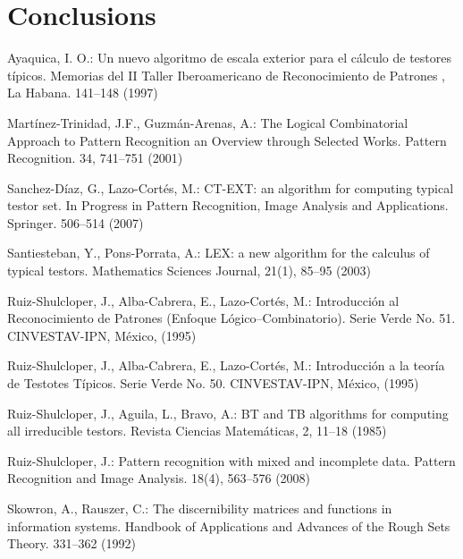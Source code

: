\documentclass[citeauthoryear]{llncs}
\begin{document}
\section{Conclusions}
%
%
\begin{thebibliography}{}
%


	Ayaquica, I. O.:
	Un nuevo algoritmo de escala exterior para el c\'alculo de testores t\'ipicos.
	Memorias del II Taller Iberoamericano de Reconocimiento de Patrones , La
	Habana. 141--148 (1997)

	Mart\'inez-Trinidad, J.F., Guzm\'an-Arenas, A.: 
	The Logical Combinatorial Approach to Pattern Recognition an Overview through Selected Works. 
	Pattern Recognition. 34, 741--751 (2001)

	Sanchez-D\'iaz, G., Lazo-Cort\'es, M.:
	CT-EXT: an algorithm for computing typical testor set. 
	In Progress in Pattern Recognition, Image Analysis and Applications. Springer. 506--514 (2007)

	Santiesteban, Y., Pons-Porrata, A.:
	LEX: a new algorithm for the calculus of typical testors. 
	Mathematics Sciences Journal, 21(1), 85--95 (2003)

	Ruiz-Shulcloper, J., Alba-Cabrera, E., Lazo-Cort\'es, M.:
	Introducci\'{o}n al Reconocimiento de Patrones (Enfoque L\'{o}gico--Combinatorio). 
	Serie Verde No. 51. CINVESTAV-IPN, México, (1995)

	Ruiz-Shulcloper, J., Alba-Cabrera, E., Lazo-Cort\'es, M.:
	Introducci\'{o}n a la teor\'ia de Testotes T\'ipicos. 
	Serie Verde No. 50. CINVESTAV-IPN, México, (1995)
	
	Ruiz-Shulcloper, J., Aguila, L., Bravo, A.:
	BT and TB algorithms for computing all irreducible testors. 
	Revista Ciencias Matem\'{a}ticas, 2, 11--18 (1985)

	Ruiz-Shulcloper, J.:
	Pattern recognition with mixed and incomplete data. 
	Pattern Recognition and Image Analysis. 18(4), 563--576 (2008)

	Skowron, A., Rauszer, C.:
	The discernibility matrices and functions in information systems. 
	Handbook of Applications and Advances of the Rough Sets Theory. 331--362  (1992)
	
	
\end{thebibliography}

%
\end{document}
